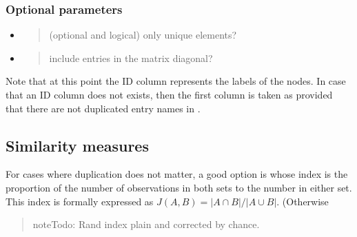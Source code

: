 \documentclass[a4paper,12pt,english]{sphinxhowto}
\begin{document}


\subsubsection{Optional parameters}
\label{\detokenize{EpigraphicNetwork:optional-parameters}}\begin{itemize}
\item {} 
\begin{quote}

(optional and logical) only unique elements?
\end{quote}

\item {} 
\begin{quote}

include entries in the matrix diagonal?
\end{quote}

\end{itemize}


Note that at this point the ID column represents the labels of the nodes. In
case that an ID column does not exists, then the first column is taken
as  provided that there are not duplicated entry names in .



\subsection{Similarity measures}
\label{\detokenize{EpigraphicNetwork:similarity-measures}}
For cases where duplication does not matter, a good option is 
whose index is the proportion of the number of observations in both sets to the number
in either set. This index is formally expressed as \(J(A,B)= \left| A \cap B \right| / \left| A \cup B \right|\).
(Otherwise
\begin{quote}

\begin{sphinxadmonition}{note}{\label{\detokenize{EpigraphicNetwork:id1}}Todo:}
Rand index plain and corrected by chance.
\end{sphinxadmonition}
\end{quote}
\end{document}
